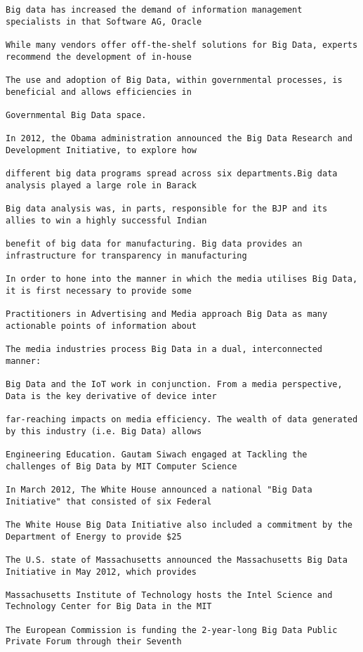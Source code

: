 \documentclass[11pt]{article}
\begin{document}
\begin{verbatim}
Big data has increased the demand of information management specialists in that Software AG, Oracle

While many vendors offer off-the-shelf solutions for Big Data, experts recommend the development of in-house

The use and adoption of Big Data, within governmental processes, is beneficial and allows efficiencies in

Governmental Big Data space.

In 2012, the Obama administration announced the Big Data Research and Development Initiative, to explore how

different big data programs spread across six departments.Big data analysis played a large role in Barack

Big data analysis was, in parts, responsible for the BJP and its allies to win a highly successful Indian

benefit of big data for manufacturing. Big data provides an infrastructure for transparency in manufacturing

In order to hone into the manner in which the media utilises Big Data, it is first necessary to provide some

Practitioners in Advertising and Media approach Big Data as many actionable points of information about

The media industries process Big Data in a dual, interconnected manner:

Big Data and the IoT work in conjunction. From a media perspective, Data is the key derivative of device inter

far-reaching impacts on media efficiency. The wealth of data generated by this industry (i.e. Big Data) allows

Engineering Education. Gautam Siwach engaged at Tackling the challenges of Big Data by MIT Computer Science

In March 2012, The White House announced a national "Big Data Initiative" that consisted of six Federal

The White House Big Data Initiative also included a commitment by the Department of Energy to provide $25

The U.S. state of Massachusetts announced the Massachusetts Big Data Initiative in May 2012, which provides

Massachusetts Institute of Technology hosts the Intel Science and Technology Center for Big Data in the MIT

The European Commission is funding the 2-year-long Big Data Public Private Forum through their Seventh


\end{verbatim}
\end{document}

